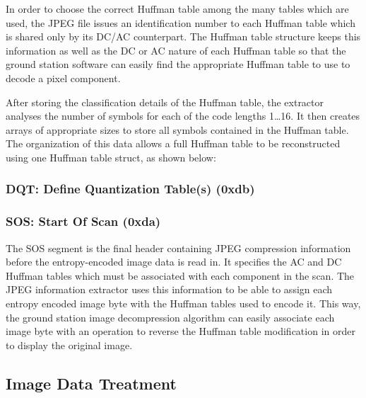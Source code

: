 In order to choose the correct Huffman table among the many
tables which are used, the JPEG file issues an identification number
to each Huffman table which is shared only by its DC/AC counterpart.
The Huffman table structure keeps this information as well as the
DC or AC nature of each Huffman table so that the ground station
software can easily find the appropriate Huffman table to use to
decode a pixel component.

After storing the classification details of the Huffman table,
the extractor analyses the number of symbols for each
of the code lengths 1\ldots16. It then creates arrays
of appropriate sizes to store all symbols contained in 
the Huffman table. The organization of this data allows
a full Huffman table to be reconstructed using one
Huffman table struct, as shown below:


\subsubsection{DQT: Define Quantization Table(s) (0xdb)}

\subsubsection{SOS: Start Of Scan (0xda)}

The SOS segment is the final header containing JPEG
compression information before the entropy-encoded
image data is read in. It specifies the AC and DC Huffman tables
which must be associated with each component in the scan.
The JPEG information extractor uses this information to be
able to assign each entropy encoded image byte with
the Huffman tables used to encode it. This way, the 
ground station image decompression algorithm can 
easily associate each image byte with an operation to
reverse the Huffman table modification in order to display
the original image.

\subsection{Image Data Treatment}

